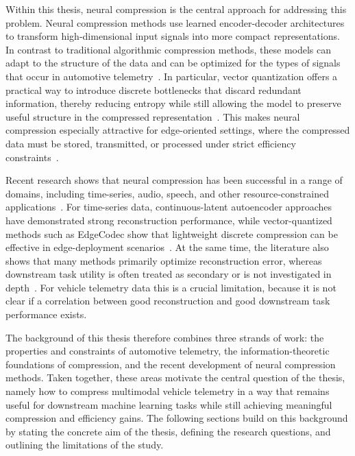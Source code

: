 Within this thesis, neural compression is the central approach for addressing this problem. Neural compression methods use learned encoder-decoder architectures to transform high-dimensional input signals into more compact representations. In contrast to traditional algorithmic compression methods, these models can adapt to the structure of the data and can be optimized for the types of signals that occur in automotive telemetry~\cite{Yang2022,Zheng2023,Liu2024}. In particular, vector quantization offers a practical way to introduce discrete bottlenecks that discard redundant information, thereby reducing entropy while still allowing the model to preserve useful structure in the compressed representation~\cite{Yang2022,Hodo2025}. This makes neural compression especially attractive for edge-oriented settings, where the compressed data must be stored, transmitted, or processed under strict efficiency constraints~\cite{Azar2022,Hodo2025}.

Recent research shows that neural compression has been successful in a range of domains, including time-series, audio, speech, and other resource-constrained applications~\cite{Löhdefink2019,Zheng2023,Liu2024,Zeghidour2021,Defossez2022,Ji2025,Azar2022,Hodo2025}. For time-series data, continuous-latent autoencoder approaches have demonstrated strong reconstruction performance, while vector-quantized methods such as EdgeCodec show that lightweight discrete compression can be effective in edge-deployment scenarios~\cite{Zheng2023,Hodo2025}. At the same time, the literature also shows that many methods primarily optimize reconstruction error, whereas downstream task utility is often treated as secondary or is not investigated in depth~\cite{Zheng2023,Hodo2025}. For vehicle telemetry data this is a crucial limitation, because it is not clear if a correlation between good reconstruction and good downstream task performance exists.

The background of this thesis therefore combines three strands of work: the properties and constraints of automotive telemetry, the information-theoretic foundations of compression, and the recent development of neural compression methods. Taken together, these areas motivate the central question of the thesis, namely how to compress multimodal vehicle telemetry in a way that remains useful for downstream machine learning tasks while still achieving meaningful compression and efficiency gains. The following sections build on this background by stating the concrete aim of the thesis, defining the research questions, and outlining the limitations of the study.

